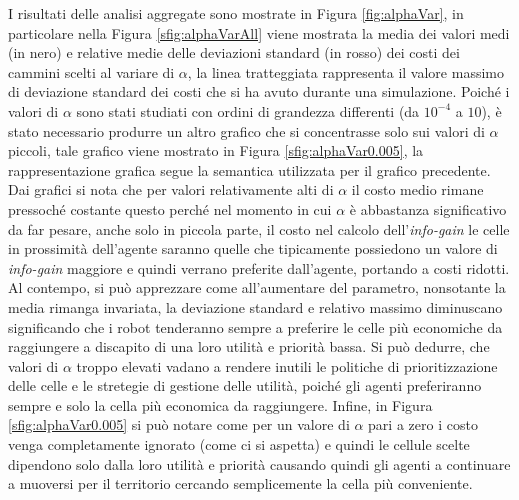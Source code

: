 I risultati delle analisi aggregate sono mostrate in Figura \ref{fig:alphaVar}, in particolare nella Figura \ref{sfig:alphaVarAll} viene mostrata la media dei valori medi (in nero) e relative medie delle deviazioni standard (in rosso) dei costi dei cammini scelti al variare di $\alpha$, la linea tratteggiata rappresenta il valore massimo di deviazione standard dei costi che si ha avuto durante una simulazione.
Poiché i valori di $\alpha$ sono stati studiati con ordini di grandezza differenti (da $10^{-4}$ a $10$), è stato necessario produrre un altro grafico che si concentrasse solo sui valori di $\alpha$ piccoli, tale grafico viene mostrato in Figura \ref{sfig:alphaVar0.005}, la rappresentazione grafica segue la semantica utilizzata per il grafico precedente.
Dai grafici si nota che per valori relativamente alti di $\alpha$ il costo medio rimane pressoché costante questo perché nel momento in cui $\alpha$ è abbastanza significativo da far pesare, anche solo in piccola parte, il costo nel calcolo dell'\textit{info-gain} le celle in prossimità dell'agente saranno quelle che tipicamente possiedono un valore di \textit{info-gain} maggiore e quindi verrano preferite dall'agente, portando a costi ridotti.
Al contempo, si può apprezzare come all'aumentare del parametro, nonsotante la media rimanga invariata, la deviazione standard e relativo massimo diminuscano significando che i robot tenderanno sempre a preferire le celle più economiche da raggiungere a discapito di una loro utilità e priorità bassa.
Si può dedurre, che valori di $\alpha$ troppo elevati vadano a rendere inutili le politiche di prioritizzazione delle celle e le stretegie di gestione delle utilità, poiché gli agenti preferiranno sempre e solo la cella più economica da raggiungere.
Infine, in Figura \ref{sfig:alphaVar0.005} si può notare come per un valore di $\alpha$ pari a zero i costo venga completamente ignorato (come ci si aspetta) e quindi le cellule scelte dipendono solo dalla loro utilità e priorità causando quindi gli agenti a continuare a muoversi per il territorio cercando semplicemente la cella più conveniente. 
